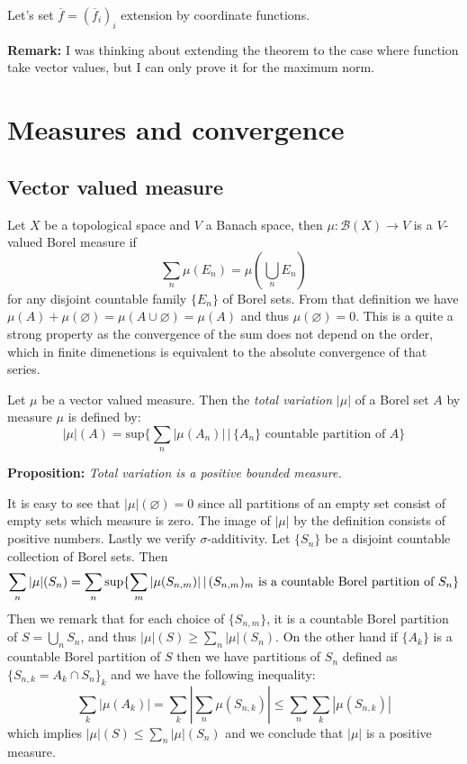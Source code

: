 \documentclass{article}
\begin{document}
\vspace{1ex}
Let's set $\overline f = (\overline f_i)_i$ extension by coordinate functions. 

\vspace{1ex}
\textbf{Remark:} I was thinking about extending the theorem to the case where
function take vector values, but I can only prove it for the maximum norm.

\section{Measures and convergence}

\subsection{Vector valued measure}
Let $X$ be a topological space and $V$ a Banach space, then $\mu:\mathcal{B}(X)
\rightarrow V$ is a $V$-valued Borel measure if
\[\sum_n\mu(E_n)=\mu(\bigcup_n E_n)\]
for any disjoint countable family $\{E_n\}$ of Borel sets. From that definition
we have $\mu(A)+\mu(\varnothing)=\mu(A\cup\varnothing)=\mu(A)$ and thus 
$\mu(\varnothing)=0$. This is a quite a strong property as the convergence of
the sum does not depend on the order, which in finite dimenetions is equivalent
to the absolute convergence of that series.

\vspace{1ex} Let $\mu$ be a vector valued measure. Then the \emph{total
variation} $|\mu|$ of a Borel set $A$  by measure $\mu$ is defined by:
\[|\mu|(A) = \text{sup}\{\sum_n|\mu(A_n)|\,|\,\{A_n\}\text{ countable partition of }A\}\]

\textbf{Proposition:} \textit{Total variation is a positive bounded measure.}

\vspace{1ex}
It is easy to see that $|\mu|(\varnothing)=0$ since all partitions of an empty
set consist of empty sets which measure is zero. The image of $|\mu|$ by the
definition consists of positive numbers. Lastly we verify $\sigma$-additivity.
Let $\{S_n\}$ be a disjoint countable collection of Borel sets. Then
\[ 
    \sum_n|\mu|(S_n) = \sum_n\sup\{\sum_m|\mu(S_{n,m})|\,|\,(S_{n,m})_m\text{ is a countable Borel partition of }S_n\} \\ 
\]
Then we remark that for each choice of $\{S_{n,m}\}$, it is a countable Borel
partition of $S=\bigcup_n S_n$, and thus $|\mu|(S)\geq\sum_n|\mu|(S_n)$. On the
other hand if $\{A_k\}$ is a countable Borel partition of $S$ then we have
partitions of $S_n$ defined as $\{S_{n,k}=A_k\cap S_n\}_k$ and we have the
following inequality:
\[
    \sum_k|\mu(A_k)|=\sum_k|\sum_n\mu(S_{n,k})|\leq\sum_n\sum_k|\mu(S_{n,k})|
\]
which implies $|\mu|(S)\leq\sum_n|\mu|(S_n)$ and we conclude that $|\mu|$ is a
positive measure.
\end{document}
